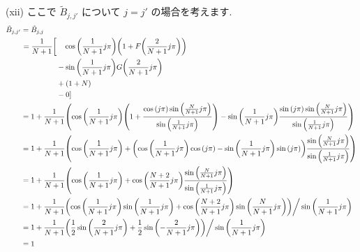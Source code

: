\documentclass[a4paper,dvipdfmx]{jsarticle}
\theoremstyle{definition}
\begin{document}
(xii) ここで $\tilde{B}_{j,j'}$ について $j = j'$ の場合を考えます.
\begin{align}
  \tilde{B}_{j,j'} & = \tilde{B}_{j,j}                                                                                                                                                                                                                                      \\
                   & \ \begin{aligned}
                         = \frac{1}{N+1}\bigg[ & \quad\cos\qty(\frac{1}{N+1}j\pi)\qty(1 + F\qty(\frac{2}{N+1}j\pi)) \\
                                               & - \sin\qty(\frac{1}{N+1}j\pi)G\qty(\frac{2}{N+1}j\pi)              \\
                                               & + \qty(1 + N)                                                      \\
                                               & - 0]
                       \end{aligned}                                                                                                                                               \\
                   & = 1 + \frac{1}{N+1}\qty(\cos\qty(\frac{1}{N+1}j\pi)\qty(1 + \frac{\cos\qty(j\pi)\sin\qty(\frac{N}{N+1}j\pi)}{\sin\qty(\frac{1}{N+1}j\pi)}) - \sin\qty(\frac{1}{N+1}j\pi)\frac{\sin\qty(j\pi)\sin\qty(\frac{N}{N+1}j\pi)}{\sin\qty(\frac{1}{N+1}j\pi)}) \\
                   & = 1 + \frac{1}{N+1}\qty(\cos\qty(\frac{1}{N+1}j\pi) + \qty(\cos\qty(\frac{1}{N+1}j\pi)\cos\qty(j\pi) - \sin\qty(\frac{1}{N+1}j\pi)\sin\qty(j\pi))\frac{\sin\qty(\frac{N}{N+1}j\pi)}{\sin\qty(\frac{1}{N+1}j\pi)})                                      \\
                   & = 1 + \frac{1}{N+1}\qty(\cos\qty(\frac{1}{N+1}j\pi) + \cos\qty(\frac{N+2}{N+1}j\pi)\frac{\sin\qty(\frac{N}{N+1}j\pi)}{\sin\qty(\frac{1}{N+1}j\pi)})                                                                                                    \\
                   & = 1 + \frac{1}{N+1}\qty(\cos\qty(\frac{1}{N+1}j\pi)\sin\qty(\frac{1}{N+1}j\pi) + \cos\qty(\frac{N+2}{N+1}j\pi)\sin\qty(\frac{N}{N+1}j\pi))\bigg/\sin\qty(\frac{1}{N+1}j\pi)                                                                            \\
                   & = 1 + \frac{1}{N+1}\qty(\frac{1}{2}\sin\qty(\frac{2}{N+1}j\pi) + \frac{1}{2}\sin\qty(-\frac{2}{N+1}j\pi))\bigg/\sin\qty(\frac{1}{N+1}j\pi)                                                                                                             \\
                   & = 1
\end{align}
\end{document}
